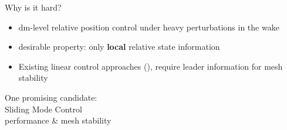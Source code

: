 \documentclass[12pt,svgnames,table,draft=false]{beamer}
\begin{document}
\usebackgroundtemplate{}


\begin{frame}{Why is it hard?}
\centering
\vspace{-6em}
\begin{tcolorbox}[width=.99\textwidth,
colback={gray!10!},
standard jigsaw,
opacityback=1,  %
]  
\begin{itemize}
\item dm-level relative position control under heavy perturbations in the wake 
\item desirable property: only \textbf{local} relative state information
\item Existing linear control approaches (\cite{shaw2007controller}), require leader information for mesh stability
\end{itemize}
\end{tcolorbox}
\end{frame}

\usebackgroundtemplate{}
\begin{frame}
\centering
\Large
\vspace{3em}
\begin{center}
One promising candidate: \\
Sliding Mode Control\\
performance \& mesh stability
\end{center}
\end{frame}
\end{document}
